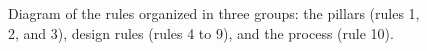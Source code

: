 \documentclass[10pt,letterpaper]{article}
\begin{document}
\begin{figure}[!h]
\centering
\caption{Diagram of the rules organized in three groups: the pillars (rules 1, 2, and 3), design rules (rules 4 to 9), and the process (rule 10).}
\label{fig:diagram}
\end{figure}
\end{document}
